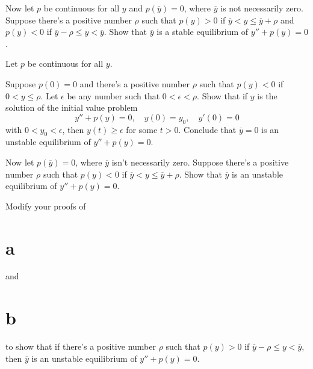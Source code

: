 \begin{exerciselist}
\begin{alist}
    \item %
    Now let $p$ be continuous for all $y$ and $p(\overline{y})=0$, where $\overline{y}$ is not necessarily zero. Suppose there's a positive number $\rho$ such that $p(y)>0$ if $\overline{y}<y\le\overline{y}+\rho$ and $p(y)<0$ if $\overline{y}-\rho\le y<\overline{y}$. Show that $\overline{y}$ is a stable equilibrium of $y''+p(y)=0$.
  \end{alist}

  \item\label{exer:4.4.24} Let $p$ be continuous for all $y$.
  \begin{alist}
    \item %
    Suppose $p(0)=0$ and there's a positive number $\rho$ such that $p(y)<0$ if $0<y\le\rho$. Let $\epsilon$ be any number such that $0<\epsilon<\rho$. Show that if $y$ is the solution of the initial value problem
    \[
      y''+p(y)=0,\quad y(0)=y_{0},\quad y'(0)=0
    \]
    with $0<y_{0}<\epsilon$, then $y(t)\ge\epsilon$ for some $t>0$. Conclude that $\overline{y}=0$ is an unstable equilibrium of $y''+p(y)=0$. 

    \item %
    Now let $p(\overline{y})=0$, where $\overline{y}$ isn't necessarily zero. Suppose there's a positive number $\rho$ such that $p(y)<0$ if $\overline{y}<y\le\overline{y}+\rho$. Show that $\overline{y}$ is an unstable equilibrium of $y''+p(y)=0$.

    \item %
    Modify your proofs of \part{a} and \part{b} to show that if there's a positive number $\rho$ such that $p(y)>0$ if $\overline{y}-\rho\le y<\overline{y}$, then $\overline{y}$ is an unstable equilibrium of $y''+p(y)=0$.
  \end{alist}
\end{exerciselist}
